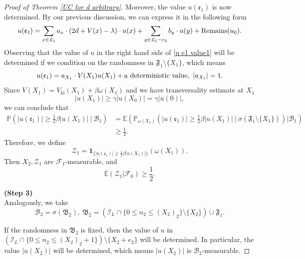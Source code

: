\documentclass[11pt,reqno,UTF8,twoside]{amsart}
\newcommand{\E}{\mathbb{E}}
\renewcommand{\P}{\mathbb{P}}
\newcommand{\mcB}{\mathcal{B}}
\newcommand{\mcF}{\mathcal{F}}
\newcommand{\mcI}{\mathcal{I}}
\newcommand{\mcZ}{\mathcal{Z}}
\theoremstyle{definition}
\numberwithin{equation}{section}
\begin{document}
\begin{proof}[Proof of Theorem \ref{UC for d arbitrary}]
Moreover, the value $u(\mathfrak{e}_1)$ is now determined. By our previous discussion, we can express it in the following form 
\begin{equation}\label{u e1 value1}
  u(\mathfrak{e}_1) = \sum_{x\in \mathfrak{L}_1} a_x \cdot (2d+V(x)-\lambda) \cdot u(x)  +\sum_{y\in \mathfrak{L}_1-e_2} b_y \cdot u(y) + {\rm Remains}(u_0).
\end{equation}
Observing that the value of $u$ in the right hand side of \eqref{u e1 value1} will be determined if we condition on the randomness in $\mathfrak{F}_1\setminus \{X_1\}$, which means
\[u(\mathfrak{e}_1) = a_{X_1} \cdot V(X_1)u(X_1)+ {\rm a\ deterministic \ value},\ |a_{X_1}|=1. \]
Since $V(X_1)=V_{\text{hi}}(X_1)+ \beta \omega(X_1)$ and we have transversality  estimate at $X_1$ 
\[|u(X_1)|\geq \gamma |u(X_0)|=\gamma |u(0)|,\]
we can conclude that 
\begin{align*}
   \P\left( |u(\mathfrak{e}_1)| \geq \frac{1}{2}\beta |u(X_1)| \ \bigg|   \ \mcB_1 \right)& = \E \left(    \P_{\omega(X_1)}\left( |u(\mathfrak{e}_1)| \geq \frac{1}{2}\beta |u(X_1)| \ \bigg|   \ \sigma(\mathfrak{F}_1 \setminus \{X_1\})  \right)  \bigg| \mcB_1 \right) \\
               &\geq \frac{1}{2}.
\end{align*}
Therefore, we define 
\begin{equation}\label{martingale UC 1}
  \mcZ_1= \mathbf{1}_{\{|u(\mathfrak{e}_1)| \geq \frac{1}{2}\beta |u(X_1)| \}}(\omega(X_1)).
\end{equation}
Then  {$X_2,\mcZ_1$ are $\mcF_1$-measurable,} and 
\begin{equation*}
  \E(\mcZ_1 | \mcF_0)\geq \frac{1}{2}.
\end{equation*}



\noindent \textbf{{(Step 3)}}\\

\noindent Analogously, we take 
\begin{equation}\label{mcB 2}
  \mcB_2=\sigma\left( \mathfrak{B}_2 \right), \ \mathfrak{B}_2 =(\mcI_L\cap \{0\leq n_2\leq (X_2)_2\} \setminus \{X_2\})\cup \mathfrak{F}_1  .
\end{equation}


If the randomness in $\mathfrak{B}_2$ is fixed, then the value of $u$ in $(\mcI_L\cap \{0\leq n_2\leq (X_2)_2+1\}) \setminus \{X_2+e_2\}$ will be determined. In particular, the value $|u(X_2)|$ will be determined, which means {$|u(X_2)|$ is $\mcB_2$-measurable}.


\end{proof}
\end{document}

